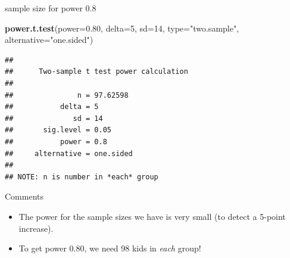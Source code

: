 \documentclass[ignorenonframetext,]{beamer}
\newenvironment{Shaded}{\begin{snugshade}}{\end{snugshade}}
\newcommand{\DataTypeTok}[1]{\textcolor[rgb]{0.13,0.29,0.53}{#1}}
\newcommand{\DecValTok}[1]{\textcolor[rgb]{0.00,0.00,0.81}{#1}}
\newcommand{\FloatTok}[1]{\textcolor[rgb]{0.00,0.00,0.81}{#1}}
\newcommand{\KeywordTok}[1]{\textcolor[rgb]{0.13,0.29,0.53}{\textbf{#1}}}
\newcommand{\NormalTok}[1]{#1}
\newcommand{\StringTok}[1]{\textcolor[rgb]{0.31,0.60,0.02}{#1}}
\providecommand{\tightlist}{%
  \setlength{\itemsep}{0pt}\setlength{\parskip}{0pt}}
\begin{document}
\begin{frame}[fragile]{sample size for power 0.8}
\protect\hypertarget{sample-size-for-power-0.8}{}

\begin{Shaded}
\begin{Highlighting}[]
\KeywordTok{power.t.test}\NormalTok{(}\DataTypeTok{power=}\FloatTok{0.80}\NormalTok{, }\DataTypeTok{delta=}\DecValTok{5}\NormalTok{, }\DataTypeTok{sd=}\DecValTok{14}\NormalTok{, }\DataTypeTok{type=}\StringTok{"two.sample"}\NormalTok{, }
             \DataTypeTok{alternative=}\StringTok{"one.sided"}\NormalTok{)}
\end{Highlighting}
\end{Shaded}

\begin{verbatim}
## 
##      Two-sample t test power calculation 
## 
##               n = 97.62598
##           delta = 5
##              sd = 14
##       sig.level = 0.05
##           power = 0.8
##     alternative = one.sided
## 
## NOTE: n is number in *each* group
\end{verbatim}

\end{frame}

\begin{frame}{Comments}
\protect\hypertarget{comments-4}{}

\begin{itemize}
\tightlist
\item
  The power for the sample sizes we have is very small (to detect a
  5-point increase).
\item
  To get power 0.80, we need 98 kids in \emph{each} group!
\end{itemize}

\end{frame}
\end{document}

